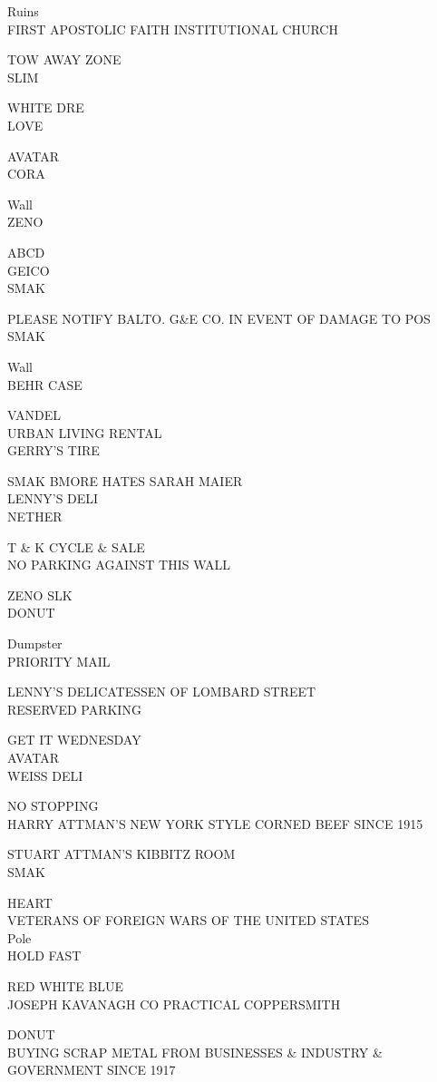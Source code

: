 \documentclass[10pt,letterpaper]{article}
\begin{document}
Ruins\\
FIRST APOSTOLIC FAITH INSTITUTIONAL CHURCH

TOW AWAY ZONE\\
SLIM

WHITE DRE\\
LOVE

AVATAR\\
CORA

Wall\\
ZENO

ABCD\\
GEICO\\
SMAK

PLEASE NOTIFY BALTO. G\&E CO. IN EVENT OF DAMAGE TO POS\\
SMAK

Wall\\
BEHR CASE

VANDEL\\
URBAN LIVING RENTAL\\
GERRY'S TIRE

SMAK BMORE HATES SARAH MAIER\\
LENNY'S DELI\\
NETHER

T \& K CYCLE \& SALE\\
NO PARKING AGAINST THIS WALL

ZENO SLK\\
DONUT

Dumpster\\
PRIORITY MAIL

LENNY'S DELICATESSEN OF LOMBARD STREET\\
RESERVED PARKING

GET IT WEDNESDAY\\
AVATAR\\
WEISS DELI

NO STOPPING\\
HARRY ATTMAN'S NEW YORK STYLE CORNED BEEF SINCE 1915

STUART ATTMAN'S KIBBITZ ROOM\\
SMAK

HEART\\
VETERANS OF FOREIGN WARS OF THE UNITED STATES\\
Pole\\
HOLD FAST

RED WHITE BLUE\\
JOSEPH KAVANAGH CO PRACTICAL COPPERSMITH

DONUT\\
BUYING SCRAP METAL FROM BUSINESSES \& INDUSTRY \& GOVERNMENT SINCE 1917
\end{document}
